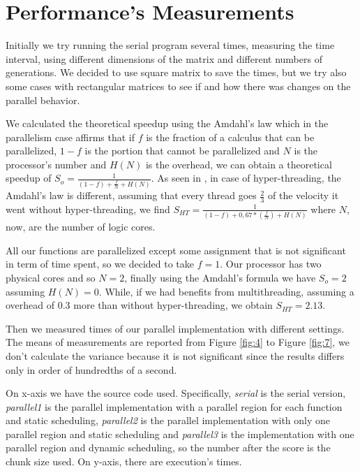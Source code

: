 \documentclass[a4paper,11pt,twoside]{report}
\begin{document}
\chapter{Performance's Measurements}\label{am}
\noindent Initially we try running the serial program several times, measuring the time interval, using different dimensions of the matrix and different numbers of generations.
We decided to use square matrix to save the times, but we try also some cases with rectangular matrices to see if and how there was changes on the parallel behavior.

\noindent We calculated the theoretical speedup using the Amdahl's law which in the parallelism case affirms that if $f$ is the fraction of a calculus that can be parallelized, $1-f$ is the portion that cannot be parallelized and $N$ is the processor's number and $H(N)$ is the overhead, we can obtain a theoretical speedup of $S_{o} = \frac{1}{(1-f) + \frac{f}{N} + H(N)}$. As seen in \cite{multi}, in case of hyper-threading, the Amdahl's law is different, assuming that every thread goes $\frac{2}{3}$ of the velocity it went without hyper-threading, we find $S_{HT} = \frac{1}{(1-f) + 0,67*(\frac{f}{N}) + H(N)}$ where $N$, now, are the number of logic cores.

\noindent All our functions are parallelized except some assignment that is not significant in term of time spent, so we decided to take $f = 1$. Our processor has two physical cores and so $N =2$, finally using the Amdahl's formula we have $S_o = 2$ assuming $H(N) =0$. While, if we had benefits from multithreading, assuming a overhead of 0.3 more than without hyper-threading, we obtain $S_{HT} = 2.13$.

\noindent Then we measured times of our parallel implementation with different settings. The means of measurements are reported from Figure \ref{fig:4} to Figure \ref{fig:7}, we don't calculate the variance because it is not significant since the results differs only in order of hundredths of a second.

\noindent On x-axis we have the source code used. Specifically, \emph{serial} is the serial version, \emph{parallel1} is the parallel implementation with a parallel region for each function and static scheduling, \emph{parallel2} is the parallel implementation with only one parallel region and static scheduling and \emph{parallel3} is the implementation with one parallel region and dynamic scheduling, so the number after the score is the chunk size used. On y-axis, there are execution's times.
\end{document}
